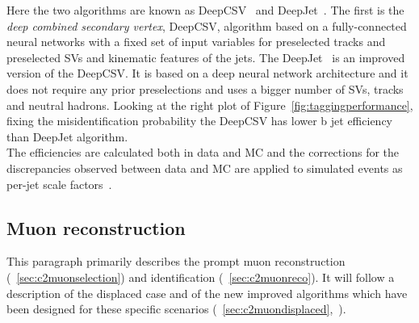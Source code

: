 Here the two algorithms are known as DeepCSV~\cite{csv} and 
DeepJet~\cite{deep}. The first is the \emph{deep combined secondary vertex}, DeepCSV,
algorithm based on a fully-connected neural networks with a fixed set
of input variables for preselected tracks and preselected SVs and
kinematic features of the jets. The DeepJet~\cite{deep} is an improved
version of the DeepCSV. It is based on a deep neural network
architecture and it does not require any prior preselections and uses
a bigger number of SVs, tracks and neutral hadrons.
Looking at the right plot of Figure~\ref{fig:taggingperformance},
fixing the misidentification probability the DeepCSV has lower b jet
efficiency than DeepJet algorithm.\\
The efficiencies are calculated both in data and MC and the
corrections for the discrepancies observed between data and MC are
applied to simulated events as per-jet scale factors~\cite{csv}.


\subsection{Muon reconstruction}\label{sec:trackmuon}
This paragraph primarily describes the prompt muon reconstruction (~\ref{sec:c2muonselection}) and
identification (~\ref{sec:c2muonreco}). It will follow a description of the displaced
case and of the new improved algorithms which have been designed for these specific
scenarios (~\ref{sec:c2muondisplaced},~\cite{CMS-DP-2015-015}).

